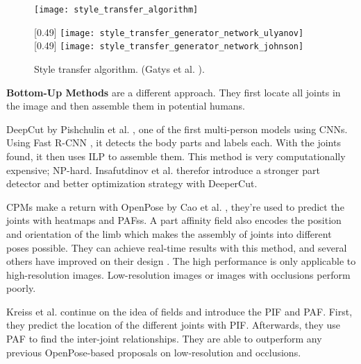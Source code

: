 \begin{figure}
	\centering
	\texttt{[image: style\_transfer\_algorithm]}%
	\caption{Style transfer algorithm. (Gatys et al. \cite{Gatys2016}).}
	\label{fig:style_transfer_algorithm}
	\parbox{\textwidth}{
		[0.49\textwidth] {
			\texttt{[image: style\_transfer\_generator\_network\_ulyanov]}%
			\label{fig:style_transfer_generator_network_ulyanov}
		}
		[0.49\textwidth] {
			\texttt{[image: style\_transfer\_generator\_network\_johnson]}%
			\label{fig:style_transfer_generator_network_johnson}
		}	
	}
\end{figure}

\textbf{Bottom-Up Methods} are a different approach.
They first locate all joints in the image and then assemble them in potential humans.

DeepCut by Pishchulin et al. \cite{Pishchulin2015}, one of the first multi-person models using \glspl{CNN}.
Using Fast R-CNN \cite{Ren2015}, it detects the body parts and labels each.
With the joints found, it then uses \gls{ILP} to assemble them.
This method is very computationally expensive; NP-hard.
Insafutdinov et al. \cite{Insafutdinov2016} therefor introduce a stronger part detector and better optimization strategy with DeeperCut.

\gls{CPMs} make a return with OpenPose by Cao et al. \cite{Cao2018}, they're used to predict the joints with heatmaps and \glspl{PAFs}.
A part affinity field also encodes the position and orientation of the limb which makes the assembly of joints into different poses possible.
They can achieve real-time results with this method, and several others have improved on their design \cite{Zhu2017, Hidalgo2019, Li2019}.
The high performance is only applicable to high-resolution images.
Low-resolution images or images with occlusions perform poorly.

Kreiss et al. \cite{Kreiss2019} continue on the idea of fields and introduce the \gls{PIF} and \gls{PAF}.
First, they predict the location of the different joints with \gls{PIF}.
Afterwards, they use \gls{PAF} to find the inter-joint relationships.
They are able to outperform any previous OpenPose-based proposals on low-resolution and occlusions.

